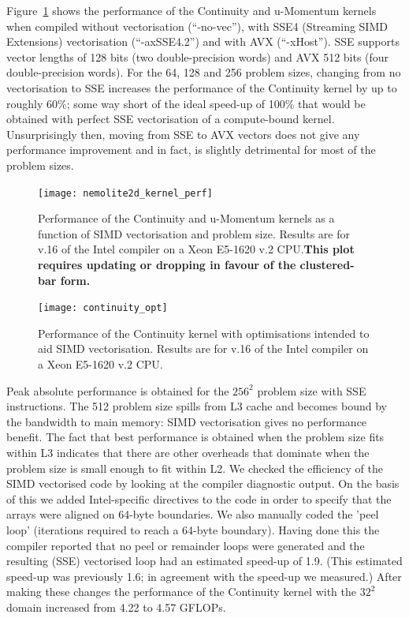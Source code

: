 \documentclass[12pt]{article}
\begin{document}
Figure~\ref{FIG_kernel_perf} shows the performance of
the Continuity and u-Momentum kernels when compiled without
vectorisation (``-no-vec''), with SSE4 (Streaming SIMD Extensions)
vectorisation (``-axSSE4.2'') and with AVX (``-xHost''). SSE supports
vector lengths of 128 bits (two double-precision words) and AVX 512
bits (four double-precision words). For the 64, 128 and 256 problem
sizes, changing from no vectorisation to SSE increases the performance
of the Continuity kernel by up to roughly 60\%; some way short of the
ideal speed-up of 100\% that would be obtained with perfect
SSE vectorisation of a compute-bound kernel. Unsurprisingly then, moving
from SSE to AVX vectors does not give any performance improvement and
in fact, is slightly detrimental for most of the problem sizes. 

\begin{figure}
  \centering
  \texttt{[image: nemolite2d\_kernel\_perf]}
  \caption{Performance of the Continuity and u-Momentum kernels as a
    function of SIMD vectorisation and problem size. Results are for
    v.16 of the Intel compiler on a Xeon E5-1620 v.2 CPU.{\bf This plot
requires updating or dropping in favour of the clustered-bar form.}}
  \label{FIG_kernel_perf}
\end{figure}

\begin{figure}
  \centering
  \texttt{[image: continuity\_opt]}
  \caption{Performance of the Continuity kernel with optimisations
    intended to aid SIMD vectorisation. Results are for v.16 of the
    Intel compiler on a Xeon E5-1620 v.2 CPU.}
  \label{FIG_cont_vec}
\end{figure}

Peak absolute performance is obtained for the $256^2$ problem size
with SSE instructions. The 512 problem size spills from L3 cache and
becomes bound by the bandwidth to main memory: SIMD vectorisation
gives no performance benefit. The fact that best performance is
obtained when the problem size fits within L3 indicates that there are
other overheads that dominate when the problem size is small enough to
fit within L2. We checked the efficiency of the SIMD vectorised code
by looking at the compiler diagnostic output. On the basis of this we
added Intel-specific directives to the code in order to specify that
the arrays were aligned on 64-byte boundaries. We also manually coded
the 'peel loop' (iterations required to reach a 64-byte
boundary). Having done this the compiler reported that no peel or
remainder loops were generated and the resulting (SSE) vectorised loop
had an estimated speed-up of 1.9. (This estimated speed-up was
previously 1.6; in agreement with the speed-up we measured.) After
making these changes the performance of the Continuity kernel with the
$32^2$ domain increased from 4.22 to 4.57 GFLOPs.
\end{document}

